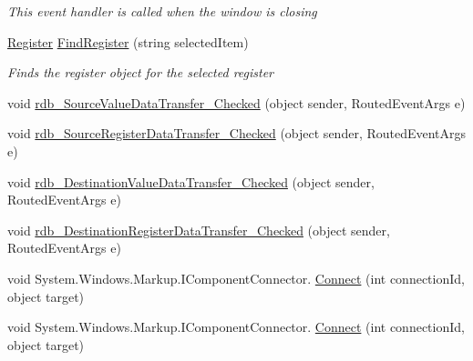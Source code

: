 \begin{DoxyCompactItemize}
\begin{DoxyCompactList}\small\item\em This event handler is called when the window is closing \end{DoxyCompactList}\item 
\hyperlink{class_c_p_u___o_s___simulator_1_1_c_p_u_1_1_register}{Register} \hyperlink{class_c_p_u___o_s___simulator_1_1_instructions_window_a2fbd163f2638a32f7cfbf831dc91582f}{Find\+Register} (string selected\+Item)
\begin{DoxyCompactList}\small\item\em Finds the register object for the selected register \end{DoxyCompactList}\item 
void \hyperlink{class_c_p_u___o_s___simulator_1_1_instructions_window_adce5e32de39213723ea06d279681b8ea}{rdb\+\_\+\+Source\+Value\+Data\+Transfer\+\_\+\+Checked} (object sender, Routed\+Event\+Args e)
\item 
void \hyperlink{class_c_p_u___o_s___simulator_1_1_instructions_window_aec7d6be51c8cd95dce4db01a5c66047e}{rdb\+\_\+\+Source\+Register\+Data\+Transfer\+\_\+\+Checked} (object sender, Routed\+Event\+Args e)
\item 
void \hyperlink{class_c_p_u___o_s___simulator_1_1_instructions_window_a8572bfa72449f43f800dd55961ad7837}{rdb\+\_\+\+Destination\+Value\+Data\+Transfer\+\_\+\+Checked} (object sender, Routed\+Event\+Args e)
\item 
void \hyperlink{class_c_p_u___o_s___simulator_1_1_instructions_window_a61a12a00e2f822ca948b2216b5dd85db}{rdb\+\_\+\+Destination\+Register\+Data\+Transfer\+\_\+\+Checked} (object sender, Routed\+Event\+Args e)
\item 
void System.\+Windows.\+Markup.\+I\+Component\+Connector. \hyperlink{class_c_p_u___o_s___simulator_1_1_instructions_window_a0efa7624a59a6abc64d0940ffaa100b0}{Connect} (int connection\+Id, object target)
\item 
void System.\+Windows.\+Markup.\+I\+Component\+Connector. \hyperlink{class_c_p_u___o_s___simulator_1_1_instructions_window_a0efa7624a59a6abc64d0940ffaa100b0}{Connect} (int connection\+Id, object target)
\end{DoxyCompactItemize}
